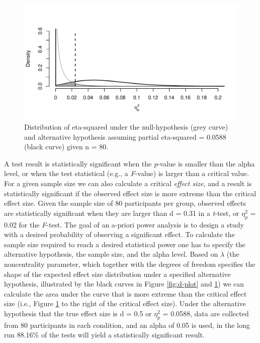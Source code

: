 \documentclass[,man,floatsintext]{apa6}
\begin{document}
\begin{figure}
\centering
\includegraphics{0.1_Simulation_Based_Power_Analysis_For_Factorial_ANOVA_Designs_files/figure-latex/eta-plot-1.pdf}
\caption{\label{fig:eta-plot}Distribution of eta-squared under the null-hypothesis (grey curve) and alternative hypothesis assuming partial eta-squared = 0.0588 (black curve) given n = 80.}
\end{figure}

A test result is statistically significant when the \emph{p}-value is smaller than the alpha level, or when the test statistical (e.g., a \emph{F}-value) is larger than a critical value.
For a given sample size we can also calculate a critical \emph{effect size}, and a result is statistically significant if the observed effect size is more extreme than the critical effect size.
Given the sample size of 80 participants per group, observed effects are statistically significant when they are larger than d = 0.31 in a \emph{t}-test, or \(\eta_p^2\) = 0.02 for the \emph{F}-test.
The goal of an a-priori power analysis is to design a study with a desired probability of observing a significant effect.
To calculate the sample size required to reach a desired statistical power one has to specify the alternative hypothesis, the sample size, and the alpha level.
Based on \(\lambda\) (the noncentrality parameter, which together with the degrees of freedom specifies the shape of the expected effect size distribution under a specified alternative hypothesis, illustrated by the black curves in Figure \ref{fig:d-plot} and \ref{fig:eta-plot}) we can calculate the area under the curve that is more extreme than the critical effect size (i.e., Figure \ref{fig:eta-plot} to the right of the critical effect size).
Under the alternative hypothesis that the true effect size is d = 0.5 or \(\eta_p^2\) = 0.0588, data are collected from 80 participants in each condition, and an alpha of 0.05 is used, in the long run 88.16\% of the tests will yield a statistically significant result.
\end{document}
